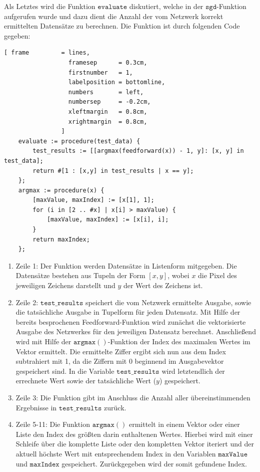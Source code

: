 \noindent
Als Letztes wird die Funktion $\mathtt{evaluate}$ diskutiert, welche in der $\mathtt{sgd}$-Funktion aufgerufen wurde und dazu dient die Anzahl der vom Netzwerk korrekt ermittelten Datensätze zu berechnen. Die Funktion ist durch folgenden Code gegeben:
\begin{Verbatim}[ frame         = lines, 
                  framesep      = 0.3cm, 
                  firstnumber   = 1,
                  labelposition = bottomline,
                  numbers       = left,
                  numbersep     = -0.2cm,
                  xleftmargin   = 0.8cm,
                  xrightmargin  = 0.8cm,
                ]
    evaluate := procedure(test_data) {
        test_results := [[argmax(feedforward(x)) - 1, y]: [x, y] in test_data];	
        return #[1 : [x,y] in test_results | x == y];
    };
    argmax := procedure(x) {
        [maxValue, maxIndex] := [x[1], 1];
        for (i in [2 .. #x] | x[i] > maxValue) {
            [maxValue, maxIndex] := [x[i], i];
        }
        return maxIndex;
    };
\end{Verbatim}
\begin{enumerate}
\item Zeile 1: Der Funktion werden Datensätze in Listenform mitgegeben. Die Datensätze bestehen aus Tupeln der Form $[x,y]$, wobei $x$ die Pixel des jeweiligen Zeichens darstellt und $y$ der Wert des Zeichens ist.
\item Zeile 2: $\mathtt{test\_results}$ speichert die vom Netzwerk ermittelte Ausgabe, sowie die tatsächliche Ausgabe in Tupelform für jeden Datensatz. Mit Hilfe der bereits besprochenen Feedforward-Funktion wird zunächst die vektorisierte Ausgabe des Netzwerkes für den jeweiligen Datensatz berechnet. Anschließend wird mit Hilfe der $\mathtt{argmax()}$-Funktion der Index des maximalen Wertes im Vektor ermittelt. Die ermittelte Ziffer ergibt sich nun aus dem Index subtrahiert mit 1, da die Ziffern mit 0 beginnend im Ausgabevektor gespeichert sind. In die Variable $\mathtt{test\_results}$ wird letztendlich der errechnete Wert sowie der tatsächliche Wert ($y$) gespeichert.
\item Zeile 3: Die Funktion gibt im Anschluss die Anzahl aller übereinstimmenden Ergebnisse in $\mathtt{test\_results}$ zurück.
\item Zeile 5-11: Die Funktion $\mathtt{argmax()}$ ermittelt in einem Vektor oder einer Liste den Index des größten darin enthaltenen Wertes. Hierbei wird mit einer Schleife über die komplette Liste oder den kompletten Vektor iteriert und der aktuell höchste Wert mit entsprechendem Index in den Variablen $\mathtt{maxValue}$ und $\mathtt{maxIndex}$ gespeichert. Zurückgegeben wird der somit gefundene Index.
\end{enumerate}

